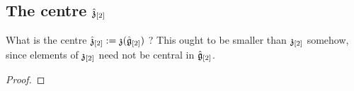     \subsection{The centre $\hat{\mathfrak{z}}_{[2]}$}
        \begin{question}
            What is the centre $\hat{\mathfrak{z}}_{[2]} := \mathfrak{z}( \hat{\mathfrak{g}}_{[2]} )$ ? This ought to be smaller than $\mathfrak{z}_{[2]}$ somehow, since elements of $\mathfrak{z}_{[2]}$ need not be central in $\hat{\mathfrak{g}}_{[2]}$. 
        \end{question}
            \begin{proof}
                
            \end{proof}